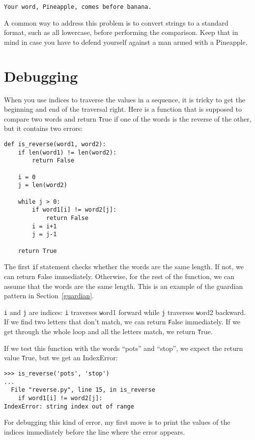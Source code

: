 \documentclass[
DIV=11,
fontsize=12,
twoside,
headinclude=false,
titlepage=firstiscover,
abstract=true,
headsepline=true,
footsepline=true,
chapterprefix=true, %
headings=big,
bibliography=totoc,%
captions=tableheading
]{scrbook}
\theoremstyle{definition}
\begin{document}
\begin{lstlisting}
Your word, Pineapple, comes before banana.
\end{lstlisting}
%
A common way to address this problem is to convert strings to a
standard format, such as all lowercase, before performing the
comparison.  Keep that in mind in case you have to defend yourself
against a man armed with a Pineapple.


\section{Debugging}

When you use indices to traverse the values in a sequence,
it is tricky to get the beginning and end of the traversal
right.  Here is a function that is supposed to compare two
words and return {\texttt True} if one of the words is the reverse
of the other, but it contains two errors:

\begin{lstlisting}
def is_reverse(word1, word2):
    if len(word1) != len(word2):
        return False
    
    i = 0
    j = len(word2)

    while j > 0:
        if word1[i] != word2[j]:
            return False
        i = i+1
        j = j-1

    return True
\end{lstlisting}
%
The first {\texttt if} statement checks whether the words are the
same length.  If not, we can return {\texttt False} immediately.
Otherwise, for the rest of the function, we can assume that the words
are the same length.  This is an example of the guardian pattern
in Section~\ref{guardian}.

{\texttt i} and {\texttt j} are indices: {\texttt i} traverses {\texttt word1}
forward while {\texttt j} traverses {\texttt word2} backward.  If we find
two letters that don't match, we can return {\texttt False} immediately.
If we get through the whole loop and all the letters match, we
return {\texttt True}.

If we test this function with the words ``pots'' and ``stop'', we
expect the return value {\texttt True}, but we get an IndexError:

\begin{lstlisting}
>>> is_reverse('pots', 'stop')
...
  File "reverse.py", line 15, in is_reverse
    if word1[i] != word2[j]:
IndexError: string index out of range
\end{lstlisting}
%
For debugging this kind of error, my first move is to
print the values of the indices immediately before the line
where the error appears.
\end{document}
